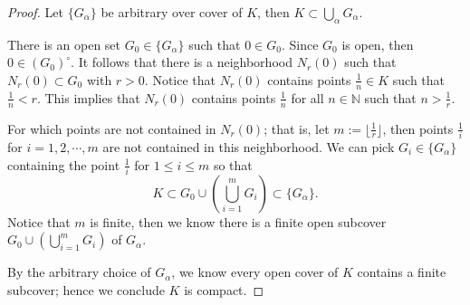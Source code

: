 \begin{Exercise}
	\begin{proof}
		Let $\{G_{\alpha}\}$ be arbitrary over cover of $K$, then $K\subset \bigcup_{\alpha}G_{\alpha}$.
		
		There is an open set $G_0 \in \{G_{\alpha}\}$ such that $0\in G_0$. Since $G_0$ is open, then $0\in (G_0)^{\circ}$. It follows that there is a neighborhood $N_r(0)$ such that $N_r(0)\subset G_0$ with $r>0$. Notice that $N_r(0)$ contains points $\frac{1}{n}\in K$ such that $\frac{1}{n}<r$. This implies that $N_r(0)$ contains points $\frac{1}{n}$ for all $n\in\mathbb{N}$ such that $n>\frac{1}{r}$.
		
		For which points are not contained in $N_r(0)$; that is, let $m := \lfloor \frac{1}{r} \rfloor$, then points $\frac{1}{i}$ for $i=1,2,\cdots,m$ are not contained in this neighborhood. We can pick $G_i\in \{G_{\alpha}\}$ containing the point $\frac{1}{i}$ for $1\leq i \leq m$ so that
		$$
		K\subset G_0\cup \left( \bigcup_{i=1}^{m}G_i \right) \subset \{G_{\alpha}\}.
		$$
		Notice that $m$ is finite, then we know there is a finite open subcover $G_0\cup \left( \bigcup_{i=1}^{m}G_i \right)$ of $G_{\alpha}$.
		
		By the arbitrary choice of $G_{\alpha}$, we know every open cover of $K$ contains a finite subcover; hence we conclude $K$ is compact.
	\end{proof}
\end{Exercise}